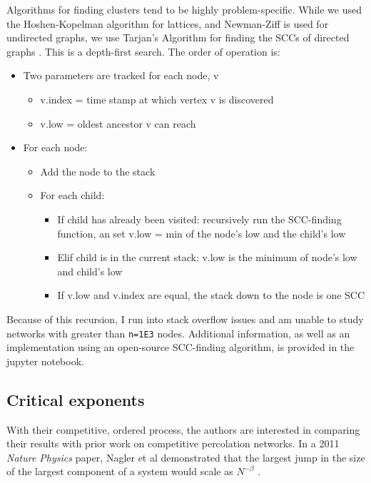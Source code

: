 \documentclass[11pt, oneside]{article}   	%
\begin{document}
Algorithms for finding clusters tend to be highly problem-specific. While we used the Hoshen-Kopelman algorithm for lattices, and Newman-Ziff is used for undirected graphs, we use Tarjan's Algorithm for finding the SCCs of directed graphs \cite{Tarjan_1972}. This is a depth-first search. The order of operation is:
\begin{itemize}
\item Two parameters are tracked for each node, v
\begin{itemize}
\item v.index = time stamp at which vertex v is discovered
\item v.low = oldest ancestor v can reach
\end{itemize}
\item For each node:
\begin{itemize}
\item Add the node to the stack
\item For each child:
\begin{itemize}
\item If child has already been visited: recursively run the SCC-finding function, an set v.low = min of the node's low and the child's low
\item Elif child is in the current stack: v.low is the minimum of node's low and child's low
\item If v.low and v.index are equal, the stack down to the node is one SCC
\end{itemize}
\end{itemize}
\end{itemize}

Because of this recursion, I run into stack overflow issues and am unable to study networks with greater than \verb|n=1E3| nodes. Additional information, as well as an implementation using an open-source SCC-finding algorithm, is provided in the jupyter notebook.

\subsection{Critical exponents}

With their competitive, ordered process, the authors are interested in comparing their results with prior work on competitive percolation networks. In a 2011 \textit{Nature Physics} paper, Nagler et al demonstrated that the largest jump in the size of the largest component of a system would scale as $N^{-\beta}$ \cite{Nagler_2011}.
\end{document}
